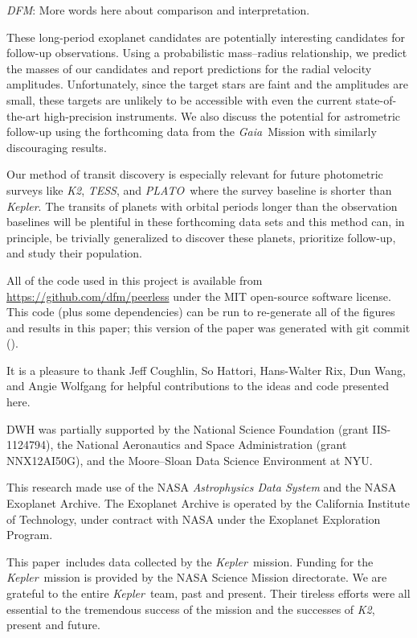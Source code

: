 \documentclass[manuscript, letterpaper]{aastex6}
\newcommand{\project}[1]{\textsl{#1}}
\newcommand{\kepler}{\project{Kepler}}
\newcommand{\KT}{\project{K2}}
\newcommand{\tess}{\project{TESS}}
\newcommand{\plato}{\project{PLATO}}
\newcommand{\gaia}{\project{Gaia}}
\newcommand{\todo}[3]{{\color{#2}\emph{#1}: #3}}
\newcommand{\dfmtodo}[1]{\todo{DFM}{red}{#1}}
\newcommand{\paper}{paper}
\begin{document}
\dfmtodo{More words here about comparison and interpretation.}

These long-period exoplanet candidates are potentially interesting candidates
for follow-up observations.
Using a probabilistic mass--radius relationship, we predict the masses of our
candidates and report predictions for the radial velocity amplitudes.
Unfortunately, since the target stars are faint and the amplitudes are small,
these targets are unlikely to be accessible with even the current
state-of-the-art high-precision instruments.
We also discuss the potential for astrometric follow-up using the forthcoming
data from the \gaia\ Mission with similarly discouraging results.

Our method of transit discovery is especially relevant for future photometric
surveys like \KT, \tess, and \plato\ where the survey baseline is shorter than
\kepler.
The transits of planets with orbital periods longer than the observation
baselines will be plentiful in these forthcoming data sets and this method
can, in principle, be trivially generalized to discover these planets,
prioritize follow-up, and study their population.

\vspace{1.5em}
All of the code used in this project is available from
\url{https://github.com/dfm/peerless} under the MIT open-source software
license.
This code (plus some dependencies) can be run to re-generate all of the
figures and results in this \paper; this version of the paper was generated
with git commit \texttt{\githash} (\gitdate).


\acknowledgments
It is a pleasure to thank
Jeff Coughlin,
So Hattori,
Hans-Walter Rix,
Dun Wang,
and
Angie Wolfgang
for helpful contributions to the ideas and code presented here.

DWH was partially supported by the National Science Foundation (grant
IIS-1124794), the National Aeronautics and Space Administration (grant
NNX12AI50G), and the Moore--Sloan Data Science Environment at NYU.

This research made use of the NASA \project{Astrophysics Data System} and the
NASA Exoplanet Archive.
The Exoplanet Archive is operated by the California Institute of Technology,
under contract with NASA under the Exoplanet Exploration Program.

This \paper\ includes data collected by the \kepler\ mission. Funding for the
\kepler\ mission is provided by the NASA Science Mission directorate.
We are grateful to the entire \kepler\ team, past and present.
Their tireless efforts were all essential to the tremendous success of the
mission and the successes of \KT, present and future.
\end{document}
